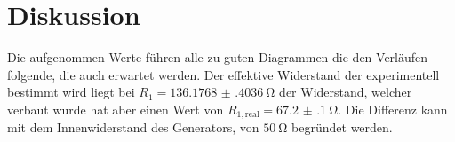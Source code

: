 \section{Diskussion}
\label{sec:Diskussion}

Die aufgenommen Werte führen alle zu guten Diagrammen die den Verläufen folgende, die auch erwartet werden.
Der effektive Widerstand der experimentell bestimmt wird liegt bei $R_1 = \SI{136.1768(4036)}{\ohm}$ der Widerstand, welcher verbaut wurde hat aber einen Wert von $R_{1,\text{real}}=\SI{67.2(1)}{\ohm}$.
Die Differenz kann mit dem Innenwiderstand des Generators, von $\SI{50}{\ohm}$ begründet werden.

 